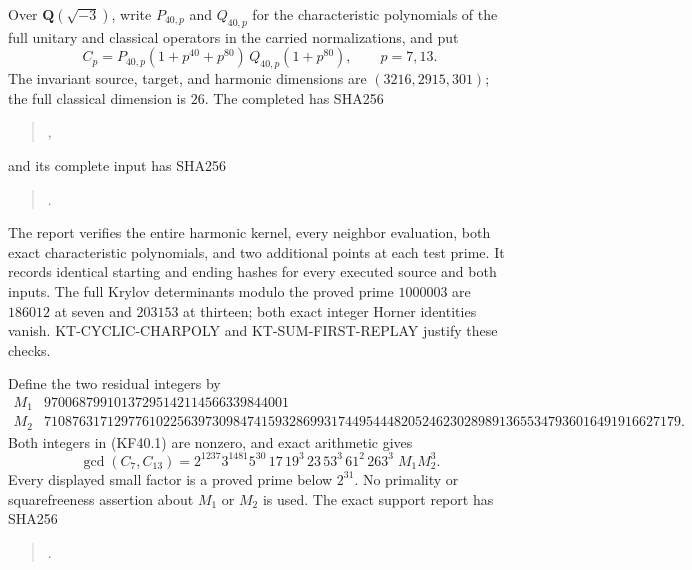 \documentclass[11pt,a4paper]{article}
\theoremstyle{definition}
\begin{document}
Over $\mathbf Q(\sqrt{-3})$, write $P_{40,p}$ and $Q_{40,p}$ for
the characteristic polynomials of the full unitary and classical
operators in the carried normalizations, and put
\[
 C_p=P_{40,p}(1+p^{40}+p^{80})\,Q_{40,p}(1+p^{80}),
                     \qquad p=7,13.                      \tag{KF40.1}
\]
The invariant source, target, and harmonic dimensions are
$(3216,2915,301)$; the full classical dimension is $26$.
The completed 
has SHA256
\begin{quote}\small
{},
\end{quote}
and its complete input has SHA256
\begin{quote}\small
{}.
\end{quote}
The report verifies the entire harmonic kernel, every neighbor
evaluation, both exact characteristic polynomials, and two
additional points at each test prime.  It records identical
starting and ending hashes for every executed source and both
inputs.  The full Krylov determinants modulo the proved prime
$1000003$ are $186012$ at seven and $203153$ at thirteen;
both exact integer Horner identities vanish.
KT-CYCLIC-CHARPOLY and KT-SUM-FIRST-REPLAY justify these checks.

Define the two residual integers by
{\scriptsize
\[
\begin{array}{c|r}
 M_1&97006879910137295142114566339844001\\
 M_2&7108763171297761022563973098474159328699317449544482052462302898913655347936016491916627179.
\end{array}                                                \tag{KF40.2}
\]
}
Both integers in (KF40.1) are nonzero, and exact arithmetic gives
\[
 \gcd(C_7,C_{13})=
 2^{1237}3^{1481}5^{30}\,17\,19^3\,23\,53^3\,61^2\,263^3
                                      \;M_1M_2^3.          \tag{KF40.3}
\]
Every displayed small factor is a proved prime below $2^{31}$.
No primality or squarefreeness assertion about $M_1$ or $M_2$
is used.  The exact support report has SHA256
\begin{quote}\small
{}.
\end{quote}
\end{document}
